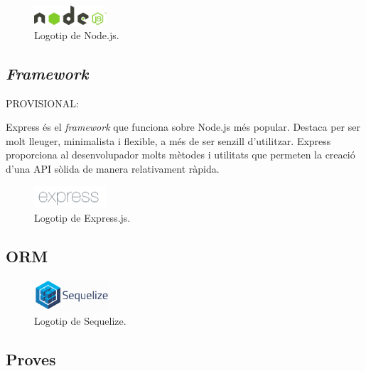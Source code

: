 \documentclass[a4paper,12pt]{ThesisStyle}
\begin{document}
\begin{figure}[H]
  \centering
  \includegraphics[width=0.24\textwidth]{assets/logos/Node.png}
  \caption{\label{img:logo_node}Logotip de Node.js.}
\end{figure}

\subsection{\textit{Framework}}
\label{subsec:decisions_servidor_framework}

PROVISIONAL:

Express és el \textit{framework} que funciona sobre Node.js més popular. Destaca per ser molt lleuger, minimalista i flexible, a més de ser senzill d'utilitzar. Express proporciona al desenvolupador molts mètodes i utilitats que permeten la creació d'una API sòlida de manera relativament ràpida.

\begin{figure}[H]
  \centering
  \includegraphics[width=0.24\textwidth]{assets/logos/Express.png}
  \caption{\label{img:logo_express}Logotip de Express.js.}
\end{figure}

\subsection{ORM}
\label{subsec:decisions_servidor_orm}



\begin{figure}[H]
  \centering
  \includegraphics[width=0.25\textwidth]{assets/logos/Sequelize.png}
  \caption{\label{img:logo_sequelize}Logotip de Sequelize.}
\end{figure}

\subsection{Proves}
\label{subsec:decisions_servidor_proves}
\end{document}
